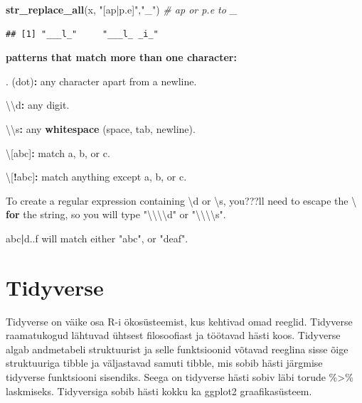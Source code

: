\documentclass[]{book}
\newenvironment{Shaded}{\begin{snugshade}}{\end{snugshade}}
\newcommand{\KeywordTok}[1]{\textcolor[rgb]{0.13,0.29,0.53}{\textbf{#1}}}
\newcommand{\CharTok}[1]{\textcolor[rgb]{0.31,0.60,0.02}{#1}}
\newcommand{\StringTok}[1]{\textcolor[rgb]{0.31,0.60,0.02}{#1}}
\newcommand{\CommentTok}[1]{\textcolor[rgb]{0.56,0.35,0.01}{\textit{#1}}}
\newcommand{\ControlFlowTok}[1]{\textcolor[rgb]{0.13,0.29,0.53}{\textbf{#1}}}
\newcommand{\OperatorTok}[1]{\textcolor[rgb]{0.81,0.36,0.00}{\textbf{#1}}}
\newcommand{\NormalTok}[1]{#1}
\begin{document}
\begin{Shaded}
\begin{Highlighting}[]
\KeywordTok{str_replace_all}\NormalTok{(x, }\StringTok{"[ap|p.e]"}\NormalTok{,}\StringTok{"_"}\NormalTok{) }\CommentTok{# ap or p.e to _}
\end{Highlighting}
\end{Shaded}

\begin{verbatim}
## [1] "___l_"     "___l_ _i_"
\end{verbatim}

\textbf{patterns that match more than one character:}

\begin{Shaded}
\begin{Highlighting}[]
\NormalTok{. (dot)}\OperatorTok{:}\StringTok{ }\NormalTok{any character apart from a newline.}

\NormalTok{\textbackslash{}\textbackslash{}d}\OperatorTok{:}\StringTok{ }\NormalTok{any digit.}

\NormalTok{\textbackslash{}\textbackslash{}s}\OperatorTok{:}\StringTok{ }\NormalTok{any }\KeywordTok{whitespace}\NormalTok{ (space, tab, newline).}

\NormalTok{\textbackslash{}[abc]}\OperatorTok{:}\StringTok{ }\NormalTok{match a, b, or c.}

\NormalTok{\textbackslash{}[}\OperatorTok{!}\NormalTok{abc]}\OperatorTok{:}\StringTok{ }\NormalTok{match anything except a, b, or c.}

\NormalTok{To create a regular expression containing \textbackslash{}d or \textbackslash{}s, you???ll need to escape the \textbackslash{} }\ControlFlowTok{for}\NormalTok{ the string, so you will type }\StringTok{"}\CharTok{\textbackslash{}\textbackslash{}\textbackslash{}\textbackslash{}}\StringTok{d"}\NormalTok{ or }\StringTok{"}\CharTok{\textbackslash{}\textbackslash{}\textbackslash{}\textbackslash{}}\StringTok{s"}\NormalTok{.}

\NormalTok{abc}\OperatorTok{|}\NormalTok{d..f will match either }\StringTok{"abc"}\NormalTok{, or }\StringTok{"deaf"}\NormalTok{. }
\end{Highlighting}
\end{Shaded}

\section{Tidyverse}\label{tidyverse}

Tidyverse on väike osa R-i ökosüsteemist, kus kehtivad omad reeglid.
Tidyverse raamatukogud lähtuvad ühtsest filosoofiast ja töötavad hästi
koos. Tidyverse algab andmetabeli struktuurist ja selle funktsioonid
võtavad reeglina sisse õige struktuuriga tibble ja väljastavad samuti
tibble, mis sobib hästi järgmise tidyverse funktsiooni sisendiks. Seega
on tidyverse hästi sobiv läbi torude \%\textgreater{}\% laskmiseks.
Tidyversiga sobib hästi kokku ka ggplot2 graafikasüsteem.
\end{document}
